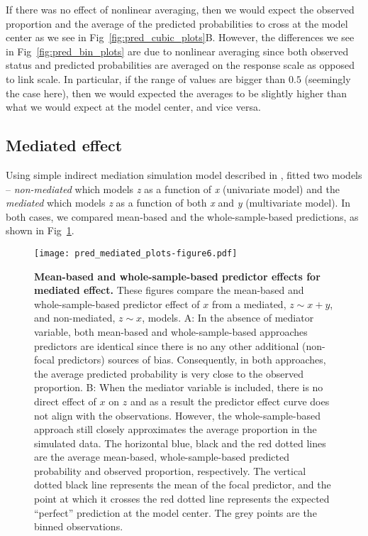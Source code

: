 \documentclass[10pt,letterpaper]{article}
\begin{document}
If there was no effect of nonlinear averaging, then we would expect the observed proportion and the average of the predicted probabilities to cross at the model center as we see in Fig~\ref{fig:pred_cubic_plots}B. However, the differences we see in Fig~\ref{fig:pred_bin_plots} are due to nonlinear averaging since both observed status and predicted probabilities are averaged on the response scale as opposed to link scale. In particular, if the range of values are bigger than $0.5$ (seemingly the case here), then we would expected the averages to be slightly higher than what we would expect at the model center, and vice versa.

\subsection*{Mediated effect}

Using simple indirect mediation simulation model described in , fitted two models -- \emph{non-mediated} which models \emph{z} as a function of \emph{x} (univariate model) and the \emph{mediated} which models \emph{z} as a function of both \emph{x} and \emph{y} (multivariate model). In both cases, we compared mean-based and the whole-sample-based predictions, as shown in Fig~\ref{fig:pred_mediated_plots}.

\begin{figure}[!h]
\centering
\texttt{[image: pred\_mediated\_plots-figure6.pdf]}
\caption{{\bf Mean-based and whole-sample-based predictor effects for mediated effect.} These figures compare the mean-based and whole-sample-based predictor effect of $x$ from a mediated, $z \sim x + y$, and non-mediated, $z \sim x$, models. A: In the absence of mediator variable, both mean-based and whole-sample-based approaches predictors are identical since there is no any other additional (non-focal predictors) sources of bias. Consequently, in both approaches, the average predicted probability is very close to the observed proportion. B: When the mediator variable is included, there is no direct effect of $x$ on $z$ and as a result the predictor effect curve does not align with the observations. However, the whole-sample-based approach still closely approximates the average proportion in the simulated data. The horizontal blue, black and the red dotted lines are the average mean-based, whole-sample-based predicted probability and observed proportion, respectively. The vertical dotted black line represents the mean of the focal predictor, and the point at which it crosses the red dotted line represents the expected ``perfect'' prediction at the model center. The grey points are the binned observations.}
\label{fig:pred_mediated_plots}
\end{figure}
\end{document}
